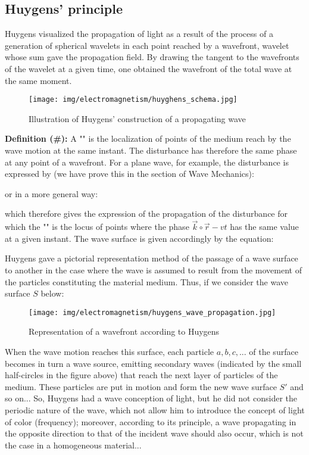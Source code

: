 	\subsection{Huygens' principle}
	Huygens visualized the propagation of light as a result of the process of a generation of spherical wavelets in each point reached by a wavefront, wavelet whose sum gave the propagation field. By drawing the tangent to the wavefronts of the wavelet at a given time, one obtained the wavefront of the total wave at the same moment.
	\begin{figure}[H]
		\centering
		\texttt{[image: img/electromagnetism/huyghens\_schema.jpg]}
		\caption{Illus­tra­tion of Huy­gens' con­struc­tion of a prop­a­gat­ing wave}
	\end{figure}
	\textbf{Definition (\#\mydef):} A "" is the localization of points of the medium reach by the wave motion at the same instant. The disturbance has therefore the same phase at any point of a wavefront. For a plane wave, for example, the disturbance is expressed by (we have prove this in the section of Wave Mechanics):
	
	or in a more general way:
	
	which therefore gives the expression of the propagation of the disturbance for which the "" is the locus of points where the phase $\vec{k}\circ\vec{r}-vt$ has the same value at a given instant. The wave surface is given accordingly by the equation:
	
	Huygens gave a pictorial representation method of the passage of a wave surface to another in the case where the wave is assumed to result from the movement of the particles constituting the material medium. Thus, if we consider the wave surface $S$ below:
	\begin{figure}[H]
		\centering
		\texttt{[image: img/electromagnetism/huygens\_wave\_propagation.jpg]}
		\caption{Representation of a wavefront according to Huygens}
	\end{figure}
	When the wave motion reaches this surface, each particle $a, b, c, ...$ of the surface becomes in turn a wave source, emitting secondary waves (indicated by the small half-circles in the figure above) that reach the next layer of particles of the medium. These particles are put in motion and form the new wave surface $S'$ and so on... So, Huygens had a wave conception of light, but he did not consider the periodic nature of the wave, which not allow him to introduce the concept of light of color (frequency); moreover, according to its principle, a wave propagating in the opposite direction to that of the incident wave should also occur, which is not the case in a homogeneous material...
	
